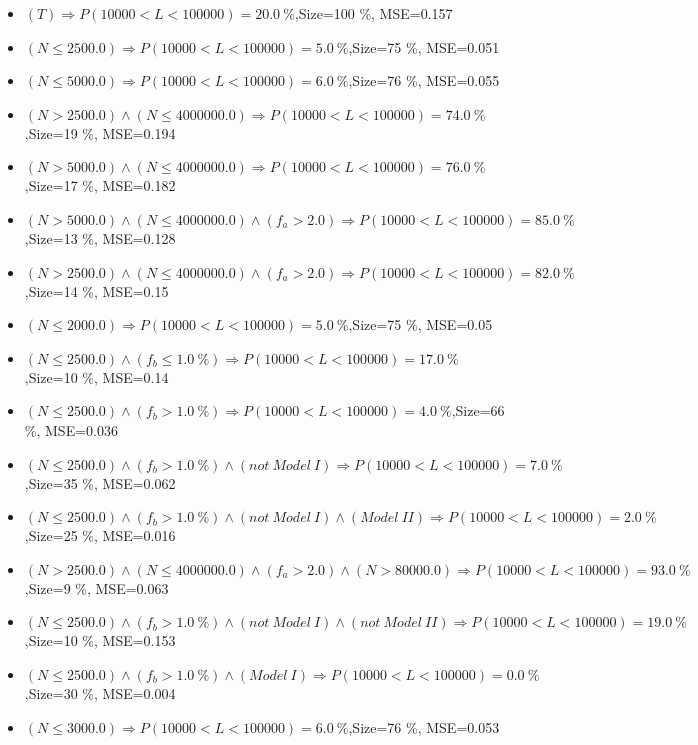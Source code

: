 \documentclass[numbered]{CSL}
\begin{document}
\begin{itemize}
\item $(T) \Rightarrow P(10 000 < L < 100 000) = 20.0~\%$,\hfill Size=100 \%, MSE=0.157
\item $(N \leq 2500.0) \Rightarrow P(10 000 < L < 100 000) = 5.0~\%$,\hfill Size=75 \%, MSE=0.051
\item $(N \leq 5000.0) \Rightarrow P(10 000 < L < 100 000) = 6.0~\%$,\hfill Size=76 \%, MSE=0.055
\item $(N > 2500.0) \land (N \leq 4000000.0) \Rightarrow P(10 000 < L < 100 000) = 74.0~\%$,\hfill Size=19 \%, MSE=0.194
\item $(N > 5000.0) \land (N \leq 4000000.0) \Rightarrow P(10 000 < L < 100 000) = 76.0~\%$,\hfill Size=17 \%, MSE=0.182
\item $(N > 5000.0) \land (N \leq 4000000.0) \land (f_a > 2.0) \Rightarrow P(10 000 < L < 100 000) = 85.0~\%$,\hfill Size=13 \%, MSE=0.128
\item $(N > 2500.0) \land (N \leq 4000000.0) \land (f_a > 2.0) \Rightarrow P(10 000 < L < 100 000) = 82.0~\%$,\hfill Size=14 \%, MSE=0.15
\item $(N \leq 2000.0) \Rightarrow P(10 000 < L < 100 000) = 5.0~\%$,\hfill Size=75 \%, MSE=0.05
\item $(N \leq 2500.0) \land (f_b \leq 1.0~\%) \Rightarrow P(10 000 < L < 100 000) = 17.0~\%$,\hfill Size=10 \%, MSE=0.14
\item $(N \leq 2500.0) \land (f_b > 1.0~\%) \Rightarrow P(10 000 < L < 100 000) = 4.0~\%$,\hfill Size=66 \%, MSE=0.036
\item $(N \leq 2500.0) \land (f_b > 1.0~\%) \land (not~Model~I) \Rightarrow P(10 000 < L < 100 000) = 7.0~\%$,\hfill Size=35 \%, MSE=0.062
\item $(N \leq 2500.0) \land (f_b > 1.0~\%) \land (not~Model~I) \land (Model~II) \Rightarrow P(10 000 < L < 100 000) = 2.0~\%$,\hfill Size=25 \%, MSE=0.016
\item $(N > 2500.0) \land (N \leq 4000000.0) \land (f_a > 2.0) \land (N > 80000.0) \Rightarrow P(10 000 < L < 100 000) = 93.0~\%$,\hfill Size=9 \%, MSE=0.063
\item $(N \leq 2500.0) \land (f_b > 1.0~\%) \land (not~Model~I) \land (not~Model~II) \Rightarrow P(10 000 < L < 100 000) = 19.0~\%$,\hfill Size=10 \%, MSE=0.153
\item $(N \leq 2500.0) \land (f_b > 1.0~\%) \land (Model~I) \Rightarrow P(10 000 < L < 100 000) = 0.0~\%$,\hfill Size=30 \%, MSE=0.004
\item $(N \leq 3000.0) \Rightarrow P(10 000 < L < 100 000) = 6.0~\%$,\hfill Size=76 \%, MSE=0.053

\end{itemize}
\end{document}
